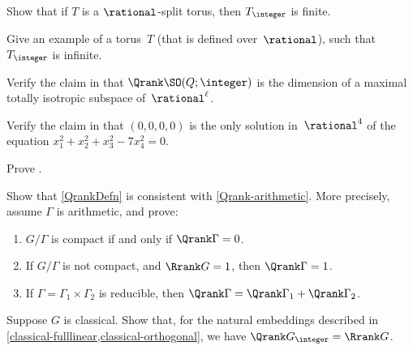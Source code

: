 \begin{exercises}

\item Show that if $T$ is a $\rational$-split torus, then
$T_{\integer}$ is finite.

\item Give an example of a torus~$T$ (that is defined over~$\rational$), such that
$T_{\integer}$ is infinite.

\item Verify the claim in  that $\Qrank \SO(Q ; \integer)$ is the dimension of a maximal totally isotropic subspace of~$\rational^\ell$.

\item \label{NoSolQ}
Verify the claim in  that $(0,0,0,0)$ is the only solution in~$\rational^4$ of the equation $x_1^2 + x_2^2 + x_3^2 - 7x_4^2 = 0$.

\item \label{Qrank0Ex}
Prove .

\item \label{QrankWellDefd}
Show that \cref{QrankDefn} is consistent with \cref{Qrank-arithmetic}. More precisely, assume $\Gamma$ is arithmetic, and prove:
	 \begin{enumerate}
	 \item $G/\Gamma$ is compact if and only if $\Qrank \Gamma = 0$. 
	 \item If $G/\Gamma$ is not compact, and $\Rrank G = 1$, then $\Qrank \Gamma = 1$. 
	 \item If $\Gamma = \Gamma_1 \times \Gamma_2$
	is reducible, then $\Qrank \Gamma  = \Qrank \Gamma_1  + \Qrank \Gamma_2$.
	 \end{enumerate}

\item \label{Qrank=Rrank}
Suppose $G$ is classical. Show that, for the natural embeddings
described in \cref{classical-fulllinear,classical-orthogonal}, we have
$\Qrank G_{\integer}  = \Rrank G$.
\end{exercises}









